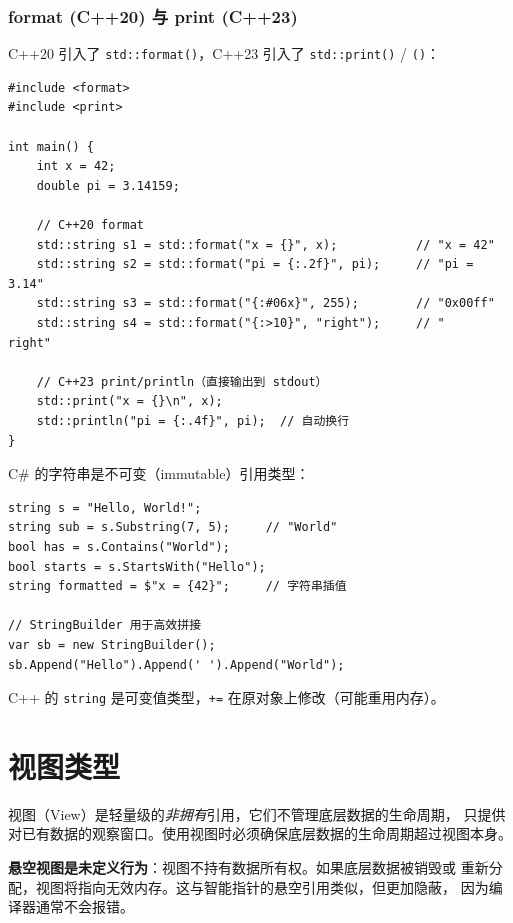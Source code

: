 \documentclass[12pt,a4paper,fontset=fandol]{ctexbook}
\newcommand{\cpp}[1]{C++#1}
\newcommand{\Fn}[1]{\texttt{#1()}}
\begin{document}
\section{format (C++20) 与 print (C++23)}

\cpp{20} 引入了 \Fn{std::format}，\cpp{23} 引入了 \Fn{std::print} / \Fn{}：

\begin{lstlisting}
#include <format>
#include <print>

int main() {
    int x = 42;
    double pi = 3.14159;

    // C++20 format
    std::string s1 = std::format("x = {}", x);           // "x = 42"
    std::string s2 = std::format("pi = {:.2f}", pi);     // "pi = 3.14"
    std::string s3 = std::format("{:#06x}", 255);        // "0x00ff"
    std::string s4 = std::format("{:>10}", "right");     // "     right"

    // C++23 print/println（直接输出到 stdout）
    std::print("x = {}\n", x);
    std::println("pi = {:.4f}", pi);  // 自动换行
}
\end{lstlisting}

\begin{compare}
C\# 的字符串是不可变（immutable）引用类型：
\begin{lstlisting}[style=csharpstyle]
string s = "Hello, World!";
string sub = s.Substring(7, 5);     // "World"
bool has = s.Contains("World");
bool starts = s.StartsWith("Hello");
string formatted = $"x = {42}";     // 字符串插值

// StringBuilder 用于高效拼接
var sb = new StringBuilder();
sb.Append("Hello").Append(' ').Append("World");
\end{lstlisting}
C++ 的 \texttt{string} 是可变值类型，\texttt{+=} 在原对象上修改（可能重用内存）。
\end{compare}

\part{视图类型}

视图（View）是轻量级的\emph{非拥有}引用，它们不管理底层数据的生命周期，
只提供对已有数据的观察窗口。使用视图时必须确保底层数据的生命周期超过视图本身。

\begin{warning}
\textbf{悬空视图是未定义行为}：视图不持有数据所有权。如果底层数据被销毁或
重新分配，视图将指向无效内存。这与智能指针的悬空引用类似，但更加隐蔽，
因为编译器通常不会报错。
\end{warning}
\end{document}

